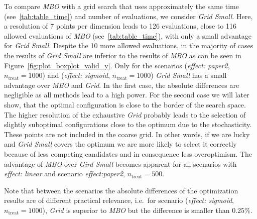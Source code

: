 \documentclass[bimj,fleqn]{w-art}
\theoremstyle{plain}
\theoremstyle{definition}
\begin{document}
To compare \emph{MBO} with a grid search that uses approximately the same time (see~\ref{tab:table_time}) and number of evaluations, we consider \emph{Grid Small}.
Here, a resolution of 7 points per dimension leads to 126 evaluations, close to 116 allowed evaluations of \emph{MBO} (see~\ref{tab:table_time}), with only a small advantage for \emph{Grid Small}.
Despite the 10 more allowed evaluations, in the majority of cases the results of \emph{Grid Small} are inferior to the results of \emph{MBO} as can be seen in Figure~\ref{fig:plot_boxplot_valid_y}.
Only for the scenarios (\emph{effect: paper2}, $n_{\text{treat}} = 1000$) and (\emph{effect: sigmoid}, $n_{\text{treat}} = 1000$) \emph{Grid Small} has a small advantage over \emph{MBO} and \emph{Grid}.
In the first case, the absolute differences are negligible as all methods lead to a high power.
For the second case we will later show, that the optimal configuration is close to the border of the search space.
The higher resolution of the exhaustive \emph{Grid} probably leads to the selection of slightly suboptimal configurations close to the optimum due to the stochasticity.
These points are not included in the coarse grid.
In other words, if we are lucky and \emph{Grid Small} covers the optimum we are more likely to select it correctly because of less competing candidates and in consequence less overoptimism.
The advantage of \emph{MBO} over \emph{Gird Small} becomes apparent for all scenarios with \emph{effect: linear} and scenario \emph{effect:paper2}, $n_{\text{treat}} = 500$.

Note that between the scenarios the absolute differences of the optimization results are of different practical relevance,
i.e.\ for scenario (\emph{effect: sigmoid}, $n_{\text{treat}} = 1000$), \emph{Grid} is superior to \emph{MBO} but the difference is smaller than $0.25\%$.
\end{document}
